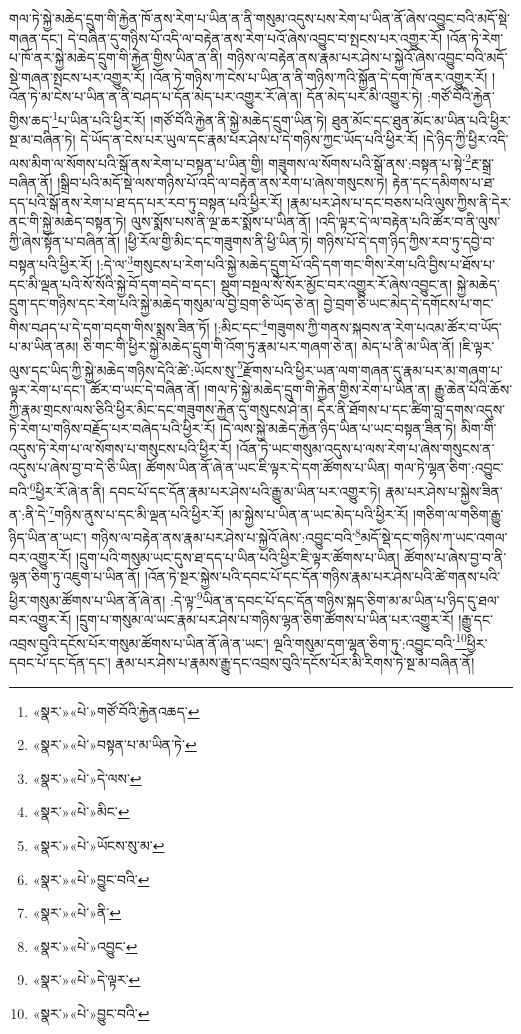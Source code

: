 གལ་ཏེ་སྐྱེ་མཆེད་དྲུག་གི་རྐྱེན་ཁོ་ནས་རེག་པ་ཡིན་ན་ནི་གསུམ་འདུས་པས་རེག་པ་ཡིན་ནོ་ཞེས་འབྱུང་བའི་མདོ་སྡེ་གཞན་དང་། དེ་བཞིན་དུ་གཉིས་པོ་འདི་ལ་བརྟེན་ནས་རེག་པའོ་ཞེས་འབྱུང་བ་སྤངས་པར་འགྱུར་རོ། །འོན་ཏེ་རེག་པ་ཁོ་ནར་སྐྱེ་མཆེད་དྲུག་གི་རྐྱེན་གྱིས་ཡིན་ན་ནི། གཉིས་ལ་བརྟེན་ནས་རྣམ་པར་ཤེས་པ་སྐྱེའོ་ཞེས་འབྱུང་བའི་མདོ་སྡེ་གཞན་སྤངས་པར་འགྱུར་རོ། །འོན་ཏེ་གཉིས་ཀ་ངེས་པ་ཡིན་ན་ནི་གཉིས་ཀའི་སྐྱོན་དེ་དག་ཁོ་ནར་འགྱུར་རོ། །འོན་ཏེ་མ་ངེས་པ་ཡིན་ན་ནི་བཤད་པ་དོན་མེད་པར་འགྱུར་རོ་ཞེ་ན། དོན་མེད་པར་མི་འགྱུར་ཏེ། :གཙོ་བོའི་རྐྱེན་གྱིས་ཆད་\footnote{«སྣར་»«པེ་»གཙོ་བོའི་རྐྱེནའཆད་}པ་ཡིན་པའི་ཕྱིར་རོ། །གཙོ་བོའི་རྐྱེན་ནི་སྐྱེ་མཆེད་དྲུག་ཡིན་ཏེ། ཐུན་མོང་དང་ཐུན་མོང་མ་ཡིན་པའི་ཕྱིར་སྔ་མ་བཞིན་ཏེ། དེ་ཡོད་ན་ངེས་པར་ཡུལ་དང་རྣམ་པར་ཤེས་པ་དེ་གཉིས་ཀྱང་ཡོད་པའི་ཕྱིར་རོ། །དེ་ཉིད་ཀྱི་ཕྱིར་འདི་ལས་མིག་ལ་སོགས་པའི་སྒོ་ནས་རེག་པ་བསྟན་པ་ཡིན་གྱི། གཟུགས་ལ་སོགས་པའི་སྒོ་ནས་:བསྟན་པ་སྟེ་\footnote{«སྣར་»«པེ་»བསྟན་པ་མ་ཡིན་ཏེ་}རྔ་སྒྲ་བཞིན་ནོ། །སྒྲིབ་པའི་མདོ་སྡེ་ལས་གཉིས་པོ་འདི་ལ་བརྟེན་ནས་རེག་པ་ཞེས་གསུངས་ཏེ། རྟེན་དང་དམིགས་པ་ཐ་དད་པའི་སྒོ་ནས་རེག་པ་ཐ་དད་པར་རབ་ཏུ་བསྟན་པའི་ཕྱིར་རོ། །རྣམ་པར་ཤེས་པ་དང་བཅས་པའི་ལུས་ཀྱིས་ནི་དེར་ནང་གི་སྐྱེ་མཆེད་བསྟན་ཏེ། ལུས་སྨོས་པས་ནི་ལྔ་ཆར་སྨོས་པ་ཡིན་ནོ། །འདི་ལྟར་དེ་ལ་བརྟེན་པའི་ཚོར་བ་ནི་ལུས་ཀྱི་ཞེས་སྟོན་པ་བཞིན་ནོ། །ཕྱི་རོལ་གྱི་མིང་དང་གཟུགས་ནི་ཕྱི་ཡིན་ཏེ། གཉིས་པོ་དེ་དག་ཉིད་ཀྱིས་རབ་ཏུ་དབྱེ་བ་བསྟན་པའི་ཕྱིར་རོ། །:དེ་ལ་\footnote{«སྣར་»«པེ་»དེ་ལས་}གསུངས་པ་རེག་པའི་སྐྱེ་མཆེད་དྲུག་པོ་འདི་དག་གང་གིས་རེག་པའི་བྱིས་པ་ཐོས་པ་དང་མི་ལྡན་པའི་སོ་སོའི་སྐྱེ་བོ་དག་བདེ་བ་དང་། སྡུག་བསྔལ་སོ་སོར་མྱོང་བར་འགྱུར་རོ་ཞེས་འབྱུང་ན། སྐྱེ་མཆེད་དྲུག་དང་གཉིས་དང་རེག་པའི་སྐྱེ་མཆེད་གསུམ་ལ་བྱེ་བྲག་ཅི་ཡོད་ཅེ་ན། བྱེ་བྲག་ཅི་ཡང་མེད་དེ་དགོངས་པ་གང་གིས་བཤད་པ་དེ་དག་བདག་གིས་སྨྲས་ཟིན་ཏོ། །:མིང་དང་\footnote{«སྣར་»«པེ་»མིང་}གཟུགས་ཀྱི་གནས་སྐབས་ན་རེག་པའམ་ཚོར་བ་ཡོད་པ་མ་ཡིན་ནམ། ཅི་གང་གི་ཕྱིར་སྐྱེ་མཆེད་དྲུག་གི་འོག་ཏུ་རྣམ་པར་གཞག་ཅེ་ན། མེད་པ་ནི་མ་ཡིན་ནོ། །ཇི་ལྟར་ལུས་དང་ཡིད་ཀྱི་སྐྱེ་མཆེད་གཉིས་དེའི་ཚེ་:ཡོངས་སུ་\footnote{«སྣར་»«པེ་»ཡོངས་སུ་མ་}རྫོགས་པའི་ཕྱིར་ཡན་ལག་གཞན་དུ་རྣམ་པར་མ་གཞག་པ་ལྟར་རེག་པ་དང་། ཚོར་བ་ཡང་དེ་བཞིན་ནོ། །གལ་ཏེ་སྐྱེ་མཆེད་དྲུག་གི་རྐྱེན་གྱིས་རེག་པ་ཡིན་ན། རྒྱུ་ཆེན་པོའི་ཆོས་ཀྱི་རྣམ་གྲངས་ལས་ཅིའི་ཕྱིར་མིང་དང་གཟུགས་རྐྱེན་དུ་གསུངས་ཤེ་ན། དེར་ནི་ཐོགས་པ་དང་ཚིག་བླ་དགས་འདུས་ཏེ་རེག་པ་གཉིས་བརྗོད་པར་བཞེད་པའི་ཕྱིར་རོ། །དེ་ལས་སྐྱེ་མཆེད་རྐྱེན་ཉིད་ཡིན་པ་ཡང་བསྟན་ཟིན་ཏེ། མིག་གི་འདུས་ཏེ་རེག་པ་ལ་སོགས་པ་གསུངས་པའི་ཕྱིར་རོ། །འོན་ཏེ་ཡང་གསུམ་འདུས་པ་ལས་རེག་པ་ཞེས་གསུངས་ན་འདུས་པ་ཞེས་བྱ་བ་དེ་ཅི་ཡིན། ཚོགས་ཡིན་ནོ་ཞེ་ན་ཡང་ཇི་ལྟར་དེ་དག་ཚོགས་པ་ཡིན། གལ་ཏེ་ལྷན་ཅིག་:འབྱུང་བའི་\footnote{«སྣར་»«པེ་»བྱུང་བའི་}ཕྱིར་རོ་ཞེ་ན་ནི། དབང་པོ་དང་དོན་རྣམ་པར་ཤེས་པའི་རྒྱུ་མ་ཡིན་པར་འགྱུར་ཏེ། རྣམ་པར་ཤེས་པ་སྐྱེས་ཟིན་ན་:ནི་དེ་\footnote{«སྣར་»«པེ་»ནི་}གཉིས་ནུས་པ་དང་མི་ལྡན་པའི་ཕྱིར་རོ། །མ་སྐྱེས་པ་ཡིན་ན་ཡང་མེད་པའི་ཕྱིར་རོ། །གཅིག་ལ་གཅིག་རྒྱུ་ཉིད་ཡིན་ན་ཡང་། གཉིས་ལ་བརྟེན་ནས་རྣམ་པར་ཤེས་པ་སྐྱེའོ་ཞེས་:འབྱུང་བའི་\footnote{«སྣར་»«པེ་»འབྱུང་}མདོ་སྡེ་དང་གཉིས་ཀ་ཡང་འགལ་བར་འགྱུར་རོ། །དྲུག་པའི་གསུམ་ཡང་དུས་ཐ་དད་པ་ཡིན་པའི་ཕྱིར་ཇི་ལྟར་ཚོགས་པ་ཡིན། ཚོགས་པ་ཞེས་བྱ་བ་ནི་ལྷན་ཅིག་ཏུ་འཇུག་པ་ཡིན་ནོ། །འོན་ཏེ་སྔར་སྐྱེས་པའི་དབང་པོ་དང་དོན་གཉིས་རྣམ་པར་ཤེས་པའི་ཚེ་གནས་པའི་ཕྱིར་གསུམ་ཚོགས་པ་ཡིན་ནོ་ཞེ་ན། :དེ་ལྟ་\footnote{«སྣར་»«པེ་»དེ་ལྟར་}ཡིན་ན་དབང་པོ་དང་དོན་གཉིས་སྐད་ཅིག་མ་མ་ཡིན་པ་ཉིད་དུ་ཐལ་བར་འགྱུར་རོ། །དྲུག་པ་གསུམ་ལ་ཡང་རྣམ་པར་ཤེས་པ་གཉིས་ལྷན་ཅིག་ཚོགས་པ་ཡིན་པར་འགྱུར་རོ། །རྒྱུ་དང་འབྲས་བུའི་དངོས་པོར་གསུམ་ཚོགས་པ་ཡིན་ནོ་ཞེ་ན་ཡང་། ལྔའི་གསུམ་དག་ལྷན་ཅིག་ཏུ་:འབྱུང་བའི་\footnote{«སྣར་»«པེ་»བྱུང་བའི་}ཕྱིར་དབང་པོ་དང་དོན་དང་། རྣམ་པར་ཤེས་པ་རྣམས་རྒྱུ་དང་འབྲས་བུའི་དངོས་པོར་མི་རིགས་ཏེ་སྔ་མ་བཞིན་ནོ། 